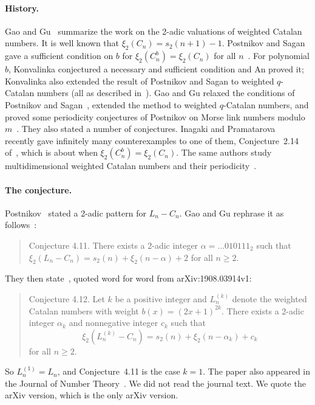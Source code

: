 \documentclass[11pt]{article}
\theoremstyle{remark}
\begin{document}
\paragraph{History.} Gao and Gu~\cite[Section~1]{GG} summarize the work on the 2-adic valuations of weighted Catalan numbers. It is well known that $\xi_2(C_n)=s_2(n+1)-1$. Postnikov and Sagan gave a sufficient condition on $b$ for $\xi_2(C^b_n)=\xi_2(C_n)$ for all $n$~\cite[Theorem~1.3]{GG}. For polynomial $b$, Konvalinka conjectured a necessary and sufficient condition and An proved it; Konvalinka also extended the result of Postnikov and Sagan to weighted $q$-Catalan numbers (all as described in~\cite[Section~1]{GG}). Gao and Gu relaxed the conditions of Postnikov and Sagan~\cite[Theorem~2.1]{GG}, extended the method to weighted $q$-Catalan numbers, and proved some periodicity conjectures of Postnikov on Morse link numbers modulo $m$~\cite[Section~4]{GG}. They also stated a number of conjectures. Inagaki and Pramatarova~\cite{IP26} recently gave infinitely many counterexamples to one of them, Conjecture~2.14 of~\cite{GG}, which is about when $\xi_2(C^b_n)=\xi_2(C_n)$. The same authors study multidimensional weighted Catalan numbers and their periodicity~\cite{IP25,IP26b}.

\paragraph{The conjecture.} Postnikov~\cite[Conjecture~3.4]{Pos} stated a 2-adic pattern for $L_n-C_n$. Gao and Gu rephrase it as follows~\cite[Section~4.3]{GG}:
\begin{quote}
Conjecture 4.11. There exists a 2-adic integer $\alpha=\dots010111_2$ such that $\xi_2(L_n-C_n)=s_2(n)+\xi_2(n-\alpha)+2$ for all $n\ge2$.
\end{quote}
They then state~\cite[Conjecture~4.12]{GG}, quoted word for word from arXiv:1908.03914v1:
\begin{quote}
Conjecture 4.12. Let $k$ be a positive integer and $L^{(k)}_n$ denote the weighted Catalan numbers with weight $b(x)=(2x+1)^{2k}$. There exists a 2-adic integer $\alpha_k$ and nonnegative integer $c_k$ such that
\[\xi_2(L^{(k)}_n-C_n)=s_2(n)+\xi_2(n-\alpha_k)+c_k\]
for all $n\ge2$.
\end{quote}
So $L^{(1)}_n=L_n$, and Conjecture~4.11 is the case $k=1$. The paper also appeared in the Journal of Number Theory~\cite{GGjnt}. We did not read the journal text. We quote the arXiv version, which is the only arXiv version.
\end{document}
